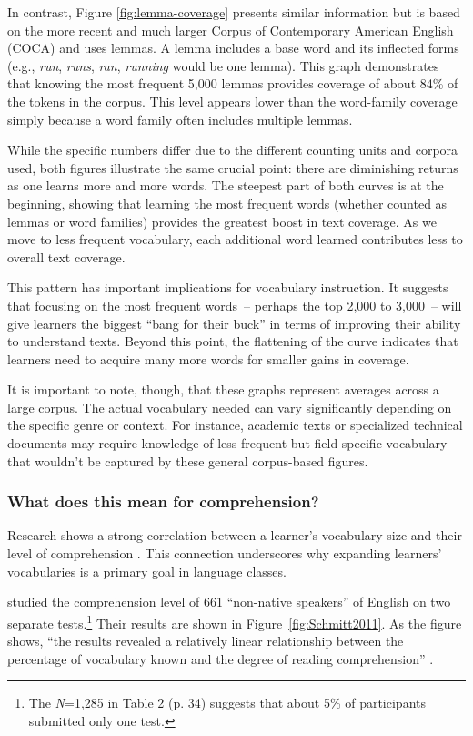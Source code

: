 In contrast, Figure \ref{fig:lemma-coverage} presents similar information but is based on the more recent and much larger Corpus of Contemporary American English (COCA) and uses lemmas. A lemma includes a base word and its inflected forms (e.g., \textit{run}, \textit{runs}, \textit{ran}, \textit{running} would be one lemma). This graph demonstrates that knowing the most frequent 5,000 lemmas provides coverage of about 84\% of the tokens in the corpus. This level appears lower than the word-family coverage simply because a word family often includes multiple lemmas.

While the specific numbers differ due to the different counting units and corpora used, both figures illustrate the same crucial point: there are diminishing returns as one learns more and more words. The steepest part of both curves is at the beginning, showing that learning the most frequent words (whether counted as lemmas or word families) provides the greatest boost in text coverage. As we move to less frequent vocabulary, each additional word learned contributes less to overall text coverage.

This pattern has important implications for vocabulary instruction. It suggests that focusing on the most frequent words~-- perhaps the top 2,000 to 3,000~-- will give learners the biggest ``bang for their buck'' in terms of improving their ability to understand texts. Beyond this point, the flattening of the curve indicates that learners need to acquire many more words for smaller gains in coverage.

It is important to note, though, that these graphs represent averages across a large corpus. The actual vocabulary needed can vary significantly depending on the specific genre or context. For instance, academic texts or specialized technical documents may require knowledge of less frequent but field-specific vocabulary that wouldn't be captured by these general corpus-based figures.

\subsubsection{What does this mean for comprehension?}
Research shows a strong correlation between a learner's vocabulary size and their level of comprehension \citep{Droop2003}. This connection underscores why expanding learners' vocabularies is a primary goal in language classes.

\citet{Schmitt2011} studied the comprehension level of 661 ``non-native speakers'' of English on two separate tests.\footnote{The \textit{N}=1,285 in Table 2 (p. 34) suggests that about 5\% of participants submitted only one test.} Their results are shown in Figure~\ref{fig:Schmitt2011}. As the figure shows, ``the results revealed a relatively linear relationship between the percentage of vocabulary known and the degree of reading comprehension'' \citep[26]{Schmitt2011}.

